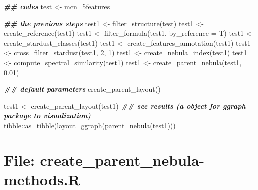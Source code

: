 \documentclass[
]{article}
\newenvironment{Shaded}{\begin{snugshade}}{\end{snugshade}}
\newcommand{\AttributeTok}[1]{\textcolor[rgb]{0.77,0.63,0.00}{#1}}
\newcommand{\DecValTok}[1]{\textcolor[rgb]{0.00,0.00,0.81}{#1}}
\newcommand{\DocumentationTok}[1]{\textcolor[rgb]{0.56,0.35,0.01}{\textbf{\textit{#1}}}}
\newcommand{\FloatTok}[1]{\textcolor[rgb]{0.00,0.00,0.81}{#1}}
\newcommand{\FunctionTok}[1]{\textcolor[rgb]{0.00,0.00,0.00}{#1}}
\newcommand{\NormalTok}[1]{#1}
\newcommand{\OtherTok}[1]{\textcolor[rgb]{0.56,0.35,0.01}{#1}}
\newcommand{\SpecialCharTok}[1]{\textcolor[rgb]{0.00,0.00,0.00}{#1}}
\begin{document}
\begin{Shaded}
\begin{Highlighting}[]
\DocumentationTok{\#\# codes}
\NormalTok{test }\OtherTok{\textless{}{-}}\NormalTok{ mcn\_5features}

\DocumentationTok{\#\# the previous steps}
\NormalTok{test1 }\OtherTok{\textless{}{-}} \FunctionTok{filter\_structure}\NormalTok{(test)}
\NormalTok{test1 }\OtherTok{\textless{}{-}} \FunctionTok{create\_reference}\NormalTok{(test1)}
\NormalTok{test1 }\OtherTok{\textless{}{-}} \FunctionTok{filter\_formula}\NormalTok{(test1, }\AttributeTok{by\_reference =}\NormalTok{ T)}
\NormalTok{test1 }\OtherTok{\textless{}{-}} \FunctionTok{create\_stardust\_classes}\NormalTok{(test1)}
\NormalTok{test1 }\OtherTok{\textless{}{-}} \FunctionTok{create\_features\_annotation}\NormalTok{(test1)}
\NormalTok{test1 }\OtherTok{\textless{}{-}} \FunctionTok{cross\_filter\_stardust}\NormalTok{(test1, }\DecValTok{2}\NormalTok{, }\DecValTok{1}\NormalTok{)}
\NormalTok{test1 }\OtherTok{\textless{}{-}} \FunctionTok{create\_nebula\_index}\NormalTok{(test1)}
\NormalTok{test1 }\OtherTok{\textless{}{-}} \FunctionTok{compute\_spectral\_similarity}\NormalTok{(test1)}
\NormalTok{test1 }\OtherTok{\textless{}{-}} \FunctionTok{create\_parent\_nebula}\NormalTok{(test1, }\FloatTok{0.01}\NormalTok{)}

\DocumentationTok{\#\# default parameters}
\FunctionTok{create\_parent\_layout}\NormalTok{()}

\NormalTok{test1 }\OtherTok{\textless{}{-}} \FunctionTok{create\_parent\_layout}\NormalTok{(test1)}
\DocumentationTok{\#\# see results (a object for \textquotesingle{}ggraph\textquotesingle{} package to visualization)}
\NormalTok{tibble}\SpecialCharTok{::}\FunctionTok{as\_tibble}\NormalTok{(}\FunctionTok{layout\_ggraph}\NormalTok{(}\FunctionTok{parent\_nebula}\NormalTok{(test1)))}
\end{Highlighting}
\end{Shaded}

\hypertarget{file-create_parent_nebula-methods.r}{%
\section{File: create\_parent\_nebula-methods.R}\label{file-create_parent_nebula-methods.r}}
\end{document}
